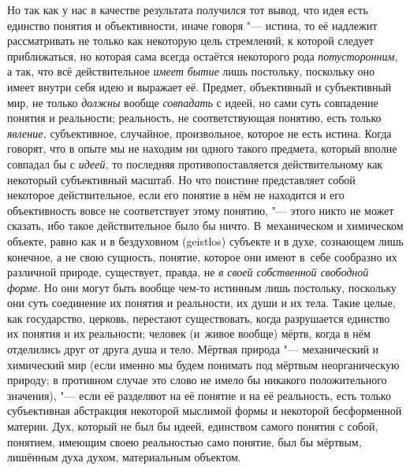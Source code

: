 Но так как у нас в качестве результата получился тот вывод,
что идея есть единство понятия и объективности, иначе говоря
"--- истина, то её надлежит рассматривать не только как
некоторую цель стремлений, к которой следует приближаться, но которая сама
всегда остаётся некоторого рода
{\em потусторонним,} а
так, что всё действительное {\em имеет
бытие} лишь постольку, поскольку оно имеет внутри себя идею
и выражает её. Предмет, объективный и субъективный мир, не только
{\em должны} вообще
{\em совпадать}
с идеей, но сами суть совпадение понятия и реальности;
реальность, не соответствующая понятию, есть только
{\em явление,}
субъективное, случайное, произвольное, которое не есть
истина. Когда говорят, что в опыте мы не находим ни одного такого предмета,
который вполне совпадал бы с
{\em идеей,} то последняя
противопоставляется действительному как некоторый
субъективный масштаб. Но что поистине представляет собой некоторое
действительное, если его понятие в нём не находится и его объективность
вовсе не соответствует этому понятию, "--- этого никто не может
сказать, ибо такое действительное было бы ничто. В~механическом и
химическом объекте, равно как и в бездуховном (geistlos)
субъекте и в духе, сознающем лишь конечное, а не свою
сущность, понятие, которое они имеют в~себе сообразно их различной природе,
существует, правда, не {\em в своей
собственной свободной форме}. Но они могут быть вообще
чем-то истинным лишь постольку, поскольку они суть соединение их понятия и
реальности, их души и их тела. Такие целые, как государство, церковь,
перестают существовать, когда разрушается единство их понятия и их
реальности; человек (и~живое вообще) мёртв, когда в нём отделились друг от
друга душа и тело. Мёртвая природа "--- механический и
химический мир (если именно мы будем понимать под мёртвым неорганическую
природу; в противном случае это слово не имело бы никакого положительного
значения), "--- если её разделяют на её понятие и на её
реальность, есть только субъективная абстракция некоторой мыслимой формы и
некоторой бесформенной материи. Дух, который не был бы идеей, единством
самого понятия с собой, понятием, имеющим своею реальностью само понятие,
был бы мёртвым, лишённым духа духом, материальным объектом.

